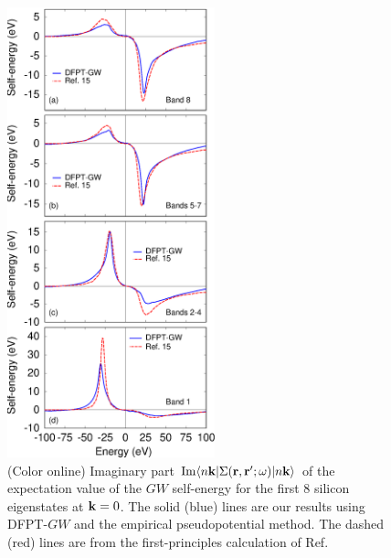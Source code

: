 \documentclass[twocolumn,prb,showpacs,superscriptaddress]{revtex4}
\def\w{\omega}
\def\k{{\bf k}}
\def\r{{\bf r}}
\def\rp{{\bf r^\prime}}
\begin{document}
\begin  {figure}
\begin  {center}
\includegraphics[width=6cm]{fig.sigma.im.eps}
\end    {center}
\caption{\label{fig.sigma}
        (Color online)
        Imaginary part ${\rm Im} \langle n\k| \Sigma(\r,\rp;\w)|n\k\rangle$ of the expectation value of the $GW$ self-energy for the first
        8 silicon eigenstates at $\k=0$. The solid (blue) lines are our results using DFPT-$GW$ and the empirical
        pseudopotential method. The dashed (red) lines are from the first-principles calculation of Ref.\ 
        }
\end    {figure}
\end{document}
